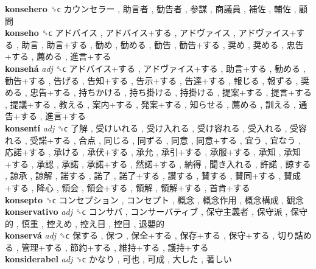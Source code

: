 \textbf{konsehero} ␝ϲ   カウンセラー ,  助言者 ,  勧告者 ,  参謀 ,  商議員 ,  補佐 ,  輔佐 ,  顧問   \\
\textbf{konseho} ␝ϲ   アドバイス ,  アドバイス+する ,  アドヴァイス ,  アドヴァイス+する ,  助言 ,  助言+する ,  勧め ,  勧める ,  勧告 ,  勧告+する ,  奨め ,  奨める ,  忠告+する ,  薦める ,  進言+する   \\
\textbf{konsehá} \emph{adj}  ␝ϲ   アドバイス+する ,  アドヴァイス+する ,  助言+する ,  勧める ,  勧告+する ,  告げる ,  告知+する ,  告示+する ,  告達+する ,  報じる ,  報ずる ,  奨める ,  忠告+する ,  持ちかける ,  持ち掛ける ,  持掛ける ,  提案+する ,  提言+する ,  提議+する ,  教える ,  案内+する ,  発案+する ,  知らせる ,  薦める ,  訓える ,  通告+する ,  進言+する   \\
\textbf{konsentí} \emph{adj}  ␝ϲ   了解 ,  受けいれる ,  受け入れる ,  受け容れる ,  受入れる ,  受容れる ,  受諾+する ,  合点 ,  同じる ,  同ずる ,  同意 ,  同意+する ,  宜う ,  宜なう ,  応諾+する ,  承ける ,  承伏+する ,  承允 ,  承引+する ,  承服+する ,  承知 ,  承知+する ,  承認 ,  承諾 ,  承諾+する ,  然諾+する ,  納得 ,  聞き入れる ,  許諾 ,  諒する ,  諒承 ,  諒解 ,  諾する ,  諾了 ,  諾了+する ,  讃する ,  賛する ,  賛同+する ,  賛成+する ,  降心 ,  領会 ,  領会+する ,  領解 ,  領解+する ,  首肯+する   \\
\textbf{konsepto} ␝ϲ   コンセプション ,  コンセプト ,  概念 ,  概念作用 ,  概念構成 ,  観念   \\
\textbf{konservativo} \emph{adj}  ␝ϲ   コンサバ ,  コンサーバティブ ,  保守主義者 ,  保守派 ,  保守的 ,  慎重 ,  控えめ ,  控え目 ,  控目 ,  退嬰的   \\
\textbf{konservá} \emph{adj}  ␝ϲ   保する ,  保つ ,  保全+する ,  保存+する ,  保守+する ,  切り詰める ,  管理+する ,  節約+する ,  維持+する ,  護持+する   \\
\textbf{konsiderabel} \emph{adj}  ␝ϲ   かなり ,  可也 ,  可成 ,  大した ,  著しい   \\
